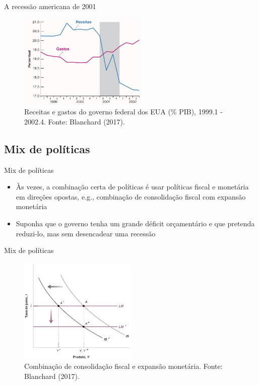 \documentclass[10pt]{beamer}
\begin{document}
\begin{frame}{A recessão americana de 2001}
\begin{figure}
    \centering
    \includegraphics[width=0.55\textwidth]{./figures/aula082_fig13.JPG}
    \caption{Receitas e gastos do governo federal dos EUA (\% PIB), 1999.1 - 2002.4. Fonte: Blanchard (2017).}
    \label{fig7}
\end{figure}
\end{frame}

\subsection{Mix de políticas}
\begin{frame}{Mix de políticas}
    \begin{itemize}
        \item Às vezes, a combinação certa de políticas é usar políticas fiscal e monetária em direções opostas, e.g., combinação de consolidação fiscal com expansão monetária
        \bigskip
        \item Suponha que o governo tenha um grande déficit orçamentário e que pretenda reduzi-lo, mas sem desencadear uma recessão
    \end{itemize}
\end{frame}

\begin{frame}{Mix de políticas}
\begin{figure}
    \centering
    \includegraphics[width=0.5\textwidth]{./figures/aula082_fig14.JPG}
    \caption{Combinação de consolidação fiscal e expansão monetária. Fonte: Blanchard (2017).}
    \label{fig8}
\end{figure}
\end{frame}
\end{document}
